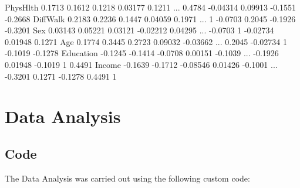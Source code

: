 \documentclass[11pt]{article}
\begin{document}
\begin{codeoutput}
PhysHlth                      0.1713    0.1612   0.1218   0.03177   0.1211  ...   0.4784  -0.04314   0.09913   -0.1551  -0.2668
DiffWalk                      0.2183    0.2236   0.1447   0.04059   0.1971  ...        1   -0.0703    0.2045   -0.1926  -0.3201
Sex                          0.03143   0.05221  0.03121  -0.02212  0.04295  ...  -0.0703         1  -0.02734   0.01948   0.1271
Age                           0.1774    0.3445   0.2723   0.09032 -0.03662  ...   0.2045  -0.02734         1   -0.1019  -0.1278
Education                    -0.1245   -0.1414  -0.0708   0.00151  -0.1039  ...  -0.1926   0.01948   -0.1019         1   0.4491
Income                       -0.1639   -0.1712 -0.08546   0.01426  -0.1001  ...  -0.3201    0.1271   -0.1278    0.4491        1


\end{codeoutput}

\section{Data Analysis}
\subsection{{Code}}
The Data Analysis was carried out using the following custom code:
\end{document}
